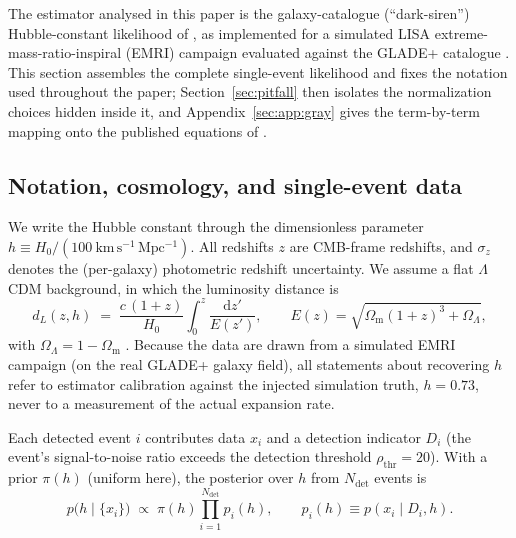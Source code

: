 The estimator analysed in this paper is the galaxy-catalogue
(``dark-siren'') Hubble-constant likelihood of \citet{Gray:2019ksv},
as implemented for a simulated LISA extreme-mass-ratio-inspiral (EMRI)
campaign \citep{Laghi:2021pqk} evaluated against the GLADE+ catalogue
\citep{Dalya:2021ewn}.  This section assembles the
complete single-event likelihood and fixes the notation used
throughout the paper; Section~\ref{sec:pitfall} then isolates the
normalization choices hidden inside it, and
Appendix~\ref{sec:app:gray} gives the term-by-term mapping onto the
published equations of \citet{Gray:2019ksv}.

\subsection{Notation, cosmology, and single-event data}
\label{sec:framework:notation}

We write the Hubble constant through the dimensionless parameter
$h \equiv H_0 / (100~\mathrm{km\,s^{-1}\,Mpc^{-1}})$.  All redshifts
$z$ are CMB-frame redshifts, and $\sigma_z$ denotes the (per-galaxy)
photometric redshift uncertainty.  We assume a flat $\Lambda$CDM
background, in which the luminosity distance is
\begin{equation}
  d_L(z, h) \;=\; \frac{c\,(1+z)}{H_0} \int_0^z
  \frac{\mathrm{d}z'}{E(z')},
  \qquad
  E(z) = \sqrt{\Omega_\mathrm{m}(1+z)^3 + \Omega_\Lambda},
  \label{eq:dl}
\end{equation}
with $\Omega_\Lambda = 1 - \Omega_\mathrm{m}$ \citep{Hogg:1999ad}.
Because the data are drawn from a simulated EMRI campaign (on the real
GLADE+ galaxy field), all statements about recovering $h$ refer to
estimator calibration against the injected simulation truth,
$h = 0.73$,
never to a measurement of the actual expansion rate.

Each detected event $i$ contributes data $x_i$ and a detection
indicator $D_i$ (the event's signal-to-noise ratio exceeds the
detection threshold $\rho_\mathrm{thr} = 20$).
With a prior $\pi(h)$ (uniform here), the posterior over $h$ from
$N_\mathrm{det}$ events is
\begin{equation}
  p\big(h \mid \{x_i\}\big) \;\propto\; \pi(h)
  \prod_{i=1}^{N_\mathrm{det}} p_i(h),
  \qquad
  p_i(h) \equiv p(x_i \mid D_i, h).
  \label{eq:posterior}
\end{equation}


